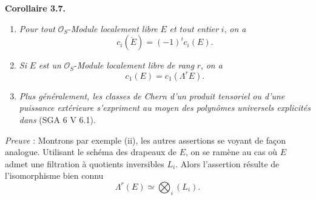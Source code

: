 \documentclass[11pt]{article}
\newenvironment{statement}[1]{\par\medskip\noindent\textbf{#1.}\ }{\par\medskip}
\begin{document}
\begin{statement}{Corollaire 3.7}
\begin{enumerate}[label=(\roman*)]
\item \emph{Pour tout} $\mathcal O_S$-\emph{Module localement libre} $E$ \emph{et tout entier} $i$, \emph{on a}
\[
c_i(\check E)=(-1)^i c_i(E).
\]
\item \emph{Si} $E$ \emph{est un} $\mathcal O_S$-\emph{Module localement libre de rang} $r$, \emph{on a}
\[
c_1(E)=c_1(\Lambda^rE).
\]
\item \emph{Plus généralement, les classes de Chern d'un produit tensoriel ou d'une puissance extérieure s'expriment au moyen des polynômes universels explicités dans} (SGA 6 V 6.1).
\end{enumerate}
\end{statement}

\emph{Preuve} : Montrons par exemple (ii), les autres assertions se voyant de façon analogue. Utilisant le schéma des drapeaux de $E$, on se ramène au cas où $E$ admet une filtration à quotients inversibles $L_i$. Alors l'assertion résulte de l'isomorphisme bien connu
\[
\Lambda^r(E)\simeq\bigotimes_i (L_i).
\]
\end{document}
